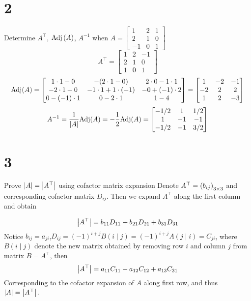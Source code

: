 \documentclass{article}
\begin{document}
\section*{2}
\begin{myleftlinebox}
    Determine \(A^\top\), \(\text{Adj}\left( A \right)\), \(A^{-1}\) when \(A = \begin{bmatrix}
        1 & 2 & 1\\
        2 & 1 & 0 \\
        -1 & 0 & 1
    \end{bmatrix}\)
    \tcblower
    \[
        A^\top = \begin{bmatrix}
            1 & 2 & -1\\
            2 & 1 & 0 \\
            1 & 0 & 1
        \end{bmatrix}
    \]
    \[
        \text{Adj}(A)= \begin{bmatrix}
            1\cdot 1-0 & -(2\cdot 1-0) & 2\cdot 0-1\cdot 1\\
            -2\cdot 1+0 & -1\cdot 1+1\cdot (-1) & -0+(-1)\cdot 2 \\
            0-(-1)\cdot 1 & 0-2\cdot 1 & 1-4
        \end{bmatrix} = \begin{bmatrix}
            1 & -2 & -1\\
            -2 & 2 & 2\\
            1 & 2 & -3
        \end{bmatrix}
    \]
    \[
        A^{-1} = \frac{1}{\left\vert A\right\vert}\text{Adj}(A) = -\frac{1}{ 2 }\text{Adj}(A) = \begin{bmatrix}
            -1/2 & 1 & 1/2\\
            1 & -1 & -1\\
            -1/2 & -1 & 3/2
        \end{bmatrix}
    \]
\end{myleftlinebox}

\section*{3}
\begin{myleftlinebox}
    Prove \(\left\vert A\right\vert = \left\vert A^\top\right\vert \) using cofactor matrix expansion
    \tcblower
    Denote \(A^\top = \left( b_{ij} \right)_{3\times 3}\) and corresponding cofactor matrix \(D_{ij}\). Then we expand \(A^\top\) along the first column and obtain

    \[
        \left\vert A^\top\right\vert = b_{11}D_{11} + b_{21}D_{21}+b_{31}D_{31}
    \]
    Notice \(b_{ij} = a_{ji}\),\( D_{ij} = (-1)^{i+j} B(i\mid j) = (-1)^{i+j}A(j\mid i) =C_{ji}\), where \(B(i \mid j) \) denote the new matrix obtained by removing row \(i\) and column \(j\) from matrix \(B = A^\top\), then
    \[
        \left\vert A^\top\right\vert = a_{11}C_{11}+a_{12}C_{12}+a_{13}C_{31}
    \]
    Corresponding to the cofactor expansion of \(A\) along first row, and thus \(\left\vert A\right\vert = \left\vert A^\top\right\vert\).
\end{myleftlinebox}
\end{document}
